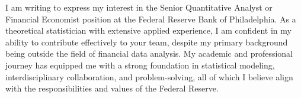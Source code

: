 \documentclass[11pt,a4paper,sans]{moderncv}
\begin{document}


	
	
	I am writing to express my interest in the Senior Quantitative Analyst or Financial Economist position at the Federal Reserve Bank of Philadelphia. As a theoretical statistician with extensive applied experience, I am confident in my ability to contribute effectively to your team, despite my primary background being outside the field of financial data analysis. My academic and professional journey has equipped me with a strong foundation in statistical modeling, interdisciplinary collaboration, and problem-solving, all of which I believe align with the responsibilities and values of the Federal Reserve.
\end{document}
